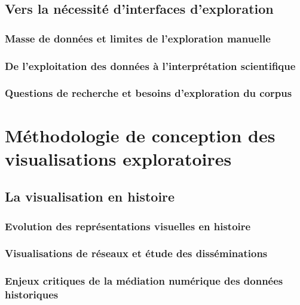 \documentclass[a4paper,12pt,twoside]{book}
\newcommand{\clearemptydoublepage}{\newpage{\pagestyle{empty}\cleardoublepage}}
\begin{document}
	\clearemptydoublepage
	
	\chapter{Vers la nécessité d'interfaces d'exploration}
	\section{Masse de données et limites de l'exploration manuelle}
	
	
	\section{De l'exploitation des données à l'interprétation scientifique}
	
	
	\section[Les besoins d'exploration du corpus]{Questions de recherche et besoins d'exploration du corpus}
	
	
	\clearemptydoublepage
	
	
	\part{Méthodologie de conception des visualisations exploratoires}
	\chapter{La visualisation en histoire}
	\section{Evolution des représentations visuelles en histoire}
	
	
	\section{Visualisations de réseaux et étude des disséminations}
	
	
	\section{Enjeux critiques de la médiation numérique des données historiques}
	
	
\end{document}
